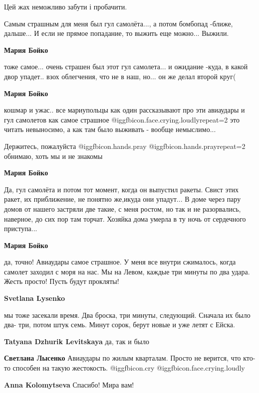 \begin{itemize}
Цей жах неможливо забути і пробачити.


Самым страшным для меня был гул самолёта..., а потом бомбопад -ближе, дальше... И
если не прямое попадание, то выжить еще можно... Выжили.

\begin{itemize} %
\textbf{Мария Бойко} 

тоже самое... очень страшен был этот гул самолета... и ожидание -куда, в какой
двор упадет.. взох облегчения, что не в наш, но... он же делал второй круг(

\textbf{Мария Бойко} 

кошмар и ужас.. все мариупольцы как один рассказывают про эти авиаудары и гул
самолетов как самое страшное  @igg{fbicon.face.crying.loudly}{repeat=2}  это читать невыносимо, а как там было
выживать - вообще немыслимо...

Держитесь, пожалуйста  @igg{fbicon.hands.pray}
@igg{fbicon.hands.pray}{repeat=2}  обнимаю, хоть мы и не знакомы

\textbf{Мария Бойко} 

Да, гул самолёта и потом тот момент, когда он выпустил ракеты. Свист этих
ракет, их приближение, не понятно же,икуда они упадут... В доме через пару
домов от нашего застряли две такие, с меня ростом, но так и не разорвались,
наверное, до сих пор там торчат. Хозяйка дома умерла в ту ночь от сердечного
приступа...

\textbf{Мария Бойко} 

да, точно! Авиаудары самое страшное. У меня все внутри сжималось, когда самолет
заходил с моря на нас. Мы на Левом, каждые три минуты по два удара. Жесть
просто! Пусть будут прокляты!

\textbf{Svetlana Lysenko} 

мы тоже засекали время. Два броска, три минуты, следующий. Сначала их было два-
три, потом штук семь. Минут сорок, берут новые и уже летят с Ейска.

\textbf{Tatyana Dzhurik Levitskaya} да, так и было

\textbf{Светлана Лысенко} Авиаудары по жилым кварталам. Просто не верится, что кто-то способен на такую жестокость.  @igg{fbicon.cry}  @igg{fbicon.face.crying.loudly} 

\textbf{Anna Kolomytseva} Спасибо! Мира вам!


\end{itemize}
\end{itemize}
